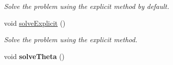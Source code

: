 \begin{DoxyCompactItemize}
\begin{DoxyCompactList}\small\item\em Solve the problem using the explicit method by default. \item\end{DoxyCompactList}\item 
\hypertarget{classHyDiffusion2D_a68af2c8f0a1fa5de0589997c8287b8db}{
void \hyperlink{classHyDiffusion2D_a68af2c8f0a1fa5de0589997c8287b8db}{solveExplicit} ()}
\label{classHyDiffusion2D_a68af2c8f0a1fa5de0589997c8287b8db}

\begin{DoxyCompactList}\small\item\em Solve the problem using the explicit method. \item\end{DoxyCompactList}\item 
\hypertarget{classHyDiffusion2D_ae5b91bf3392c29384651599d8d115284}{
void {\bfseries solveTheta} ()}
\label{classHyDiffusion2D_ae5b91bf3392c29384651599d8d115284}


\end{DoxyCompactItemize}
